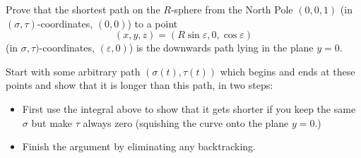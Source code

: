 \documentclass[newpage,hints,handout,noauthor,nooutcomes,12pt]{ximera}
\begin{document}
\begin{problem}
  Prove that the shortest path on the $R$-sphere from the North Pole $(0,0,1)$
  (in $(\sigma,\tau)$-coordinates, $(0,0)$) to a point
  \[
  (x,y,z)=(R\sin \varepsilon,0,\cos \varepsilon)
  \]
  (in $\sigma,\tau)$-coordinates, $(\varepsilon,0)$) is the downwards path lying in the
  plane $y=0$.
  \begin{hint}
    Start with some arbitrary path $(\sigma(t),\tau(t))$ which begins
    and ends at these points and show that it is longer than this
    path, in two steps:
    \begin{itemize}
    \item First use the integral above to show that it gets shorter if
      you keep the same $\sigma$ but make $\tau$ always zero (squishing the curve
      onto the plane $y=0$.)
    \item Finish the argument by eliminating any backtracking.
    \end{itemize}
  \end{hint}


\end{problem}
\end{document}
